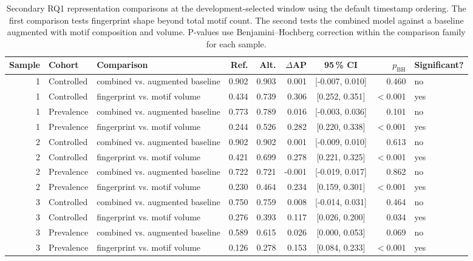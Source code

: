 \begin{table}[ht]
\centering
\caption{Secondary RQ1 representation comparisons at the development-selected window using the default timestamp ordering. The first comparison tests fingerprint shape beyond total motif count. The second tests the combined model against a baseline augmented with motif composition and volume. P-values use Benjamini--Hochberg correction within the comparison family for each sample.}
\label{tab:res_rq1_representations}
\scriptsize
\setlength{\tabcolsep}{5pt}
\begin{tabular}{@{}r l p{3.4cm} r r r c r l@{}}
\toprule
\textbf{Sample} & \textbf{Cohort} & \textbf{Comparison} & \textbf{Ref.} & \textbf{Alt.} & \textbf{$\Delta$AP} & \textbf{95\,\% CI} & \textbf{$p_{\mathrm{BH}}$} & \textbf{Significant?} \\
\midrule
1 & Controlled & combined vs. augmented baseline & 0.902 & 0.903 & 0.001 & [-0.007, 0.010] & 0.460 & no \\
1 & Controlled & fingerprint vs. motif volume & 0.434 & 0.739 & 0.306 & [0.252, 0.351] & $<$0.001 & yes \\
1 & Prevalence & combined vs. augmented baseline & 0.773 & 0.789 & 0.016 & [-0.003, 0.036] & 0.101 & no \\
1 & Prevalence & fingerprint vs. motif volume & 0.244 & 0.526 & 0.282 & [0.220, 0.338] & $<$0.001 & yes \\
2 & Controlled & combined vs. augmented baseline & 0.902 & 0.902 & 0.001 & [-0.009, 0.010] & 0.613 & no \\
2 & Controlled & fingerprint vs. motif volume & 0.421 & 0.699 & 0.278 & [0.221, 0.325] & $<$0.001 & yes \\
2 & Prevalence & combined vs. augmented baseline & 0.722 & 0.721 & -0.001 & [-0.019, 0.017] & 0.862 & no \\
2 & Prevalence & fingerprint vs. motif volume & 0.230 & 0.464 & 0.234 & [0.159, 0.301] & $<$0.001 & yes \\
3 & Controlled & combined vs. augmented baseline & 0.750 & 0.759 & 0.008 & [-0.014, 0.031] & 0.464 & no \\
3 & Controlled & fingerprint vs. motif volume & 0.276 & 0.393 & 0.117 & [0.026, 0.200] & 0.034 & yes \\
3 & Prevalence & combined vs. augmented baseline & 0.589 & 0.615 & 0.026 & [0.000, 0.053] & 0.069 & no \\
3 & Prevalence & fingerprint vs. motif volume & 0.126 & 0.278 & 0.153 & [0.084, 0.233] & $<$0.001 & yes \\
\bottomrule
\end{tabular}
\end{table}
